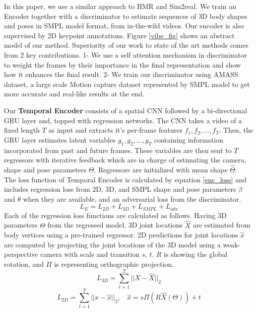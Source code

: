 \documentclass[extendedabs]{bmvc2k}
\begin{document}
In this paper, we use a similar approach to HMR and Sim2real. We train an Encoder together with a discriminator to estimate sequences of 3D body shapes and poses in SMPL model format, from in-the-wild videos. Our encoder is also supervised by 2D keypoint annotations. Figure \ref{vibe_fig} shows an abstract model of our method. Superiority of our work to state of the art methods comes from 2 key contributions. 1- We use a self attention mechanism in discriminator to weight the frames by their importance in the final representation and show how it enhances the final result. 2- We train our discriminator using AMASS dataset\cite{Mahmood_2019_ICCV}, a large scale Motion capture dataset represented by SMPL model to get more accurate and real-like results at the end. 

Our \textbf{Temporal Encoder} consists of a spatial CNN followed by a bi-directional GRU layer and, topped with regression networks. The CNN takes a video of a fixed length $T$ as input and extracts it's per-frame features $f_1, f_2, ...,f_T$. Then, the GRU layer estimates latent variables $g_1, g_2, ..., g_T$ containing information incorporated from past and future frames. These variables are then sent to $T$ regressors with iterative feedback which are in charge of estimating the camera, shape and pose parameters $\Theta$. Regressors are initialized with mean shape $\hat{\Theta}$.\\
The loss function of Temporal Encoder is calculated by equation \ref{enc_loss} and includes regression loss from 2D, 3D, and SMPL shape and pose parameters $\beta$ and $\theta$ when they are available, and an adversarial loss from the discriminator.
\begin{equation}
    \label{enc_loss}
    L_E = L_{2D} + L_{3D} + L_{SMPL} + L_{adv}
\end{equation}
Each of the regression loss functions are calculated as follows. Having 3D parameters $\Theta$ from the regressed model, 3D joint locations $\hat{X}$ are estimated from body vertices using a pre-trained regressor. 2D predictions for joint locations $\hat{x}$ are computed by projecting the joint locations of the 3D model using a weak-perspective camera with scale and transition $s$, $t$. $R$ is showing the global rotation, and $\Pi$ is representing orthographic projection.
\begin{equation}
    L_{3D} = \sum_{t=1}^T ||X - \hat{X}||_2
\end{equation}
\vspace{-1mm}
\begin{equation}
   L_{2D} = \sum_{t=1}^T ||x - \hat{x}||_2, \> \>\>\>
    \hat{x} = s\Pi(R \hat{X}(\Theta)) + t 
\end{equation}
\end{document}
